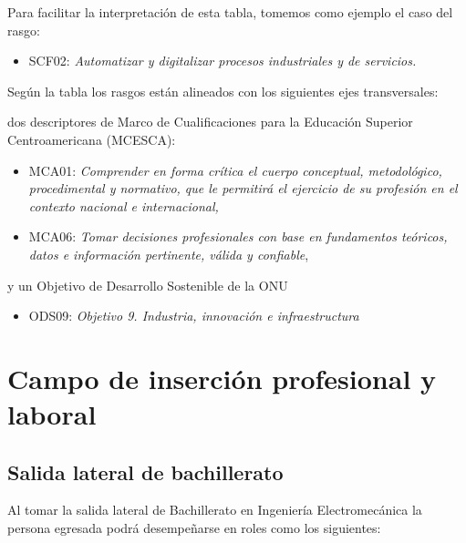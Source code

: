 Para facilitar la interpretación de esta tabla, tomemos como ejemplo el caso del rasgo:\par

\begin{itemize}
\item SCF02: \textit{Automatizar y digitalizar procesos industriales y de servicios}\textit{.}
\end{itemize}
Según la tabla los rasgos están alineados con los siguientes ejes transversales:\par

dos descriptores de Marco de Cualificaciones para la Educación Superior Centroamericana (MCESCA):\par

\begin{itemize}
\item MCA01: \textit{Comprender en forma crítica el cuerpo conceptual, metodológico, procedimental y normativo, que le permitirá el ejercicio de su profesión en el contexto nacional e internacional,}
\item MCA06: \textit{Tomar decisiones profesionales con base en fundamentos teóricos, datos e información pertinente, válida y confiable},
\end{itemize}
y un Objetivo de Desarrollo Sostenible de la ONU\par

\begin{itemize}
\item ODS09: \textit{Objetivo 9. Industria, innovación e infraestructura}
\end{itemize}
\section*{Campo de inserción profesional y laboral}

\subsection*{Salida lateral de bachillerato}

Al tomar la salida lateral de Bachillerato en Ingeniería Electromecánica la persona egresada podrá desempeñarse en roles como los siguientes:\par

